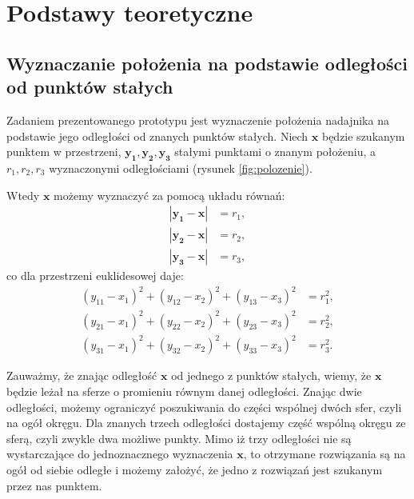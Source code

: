 \chapter{Podstawy teoretyczne}
\section{Wyznaczanie położenia na podstawie odległości od punktów stałych}

Zadaniem prezentowanego prototypu jest wyznaczenie położenia nadajnika na podstawie jego 
odległości od znanych punktów stałych. Niech $\boldsymbol{x}$ będzie szukanym punktem w przestrzeni,
$\boldsymbol{y_1,y_2,y_3}$ stałymi punktami o znanym położeniu, a $r_1,r_2,r_3$ wyznaczonymi odległościami
(rysunek \ref{fig:polozenie}).

Wtedy $\boldsymbol{x}$ możemy wyznaczyć za pomocą układu równań:
\[
 \begin{align}
    |\boldsymbol{y_1} - \boldsymbol{x}| &= r_1,
 \\ |\boldsymbol{y_2} - \boldsymbol{x}| &= r_2,
 \\ |\boldsymbol{y_3} - \boldsymbol{x}| &= r_3,
 \end{align}
\]
co dla przestrzeni euklidesowej daje:
\[
 \begin{align}
     (y_{11}-x_1)^2 + (y_{12}-x_2)^2 + (y_{13}-x_3)^2 &= r_1^2,
 \\  (y_{21}-x_1)^2 + (y_{22}-x_2)^2 + (y_{23}-x_3)^2 &= r_2^2,
 \\  (y_{31}-x_1)^2 + (y_{32}-x_2)^2 + (y_{33}-x_3)^2 &= r_3^2.
 \end{align}
\]

Zauważmy, że znając odległość $\boldsymbol{x}$ od jednego z punktów stałych, wiemy, że $\boldsymbol{x}$ będzie leżał na
sferze o promieniu równym danej odległości. Znając dwie odległości, możemy ograniczyć poszukiwania do części wspólnej dwóch sfer,
czyli na ogół okręgu. Dla znanych trzech odległości dostajemy część wspólną okręgu ze sferą, czyli zwykle dwa możliwe punkty.
Mimo iż trzy odległości nie są wystarczające do jednoznacznego wyznaczenia $\boldsymbol{x}$, 
to otrzymane rozwiązania są na ogół od siebie odległe i 
możemy założyć, że jedno z rozwiązań jest szukanym przez nas punktem.

